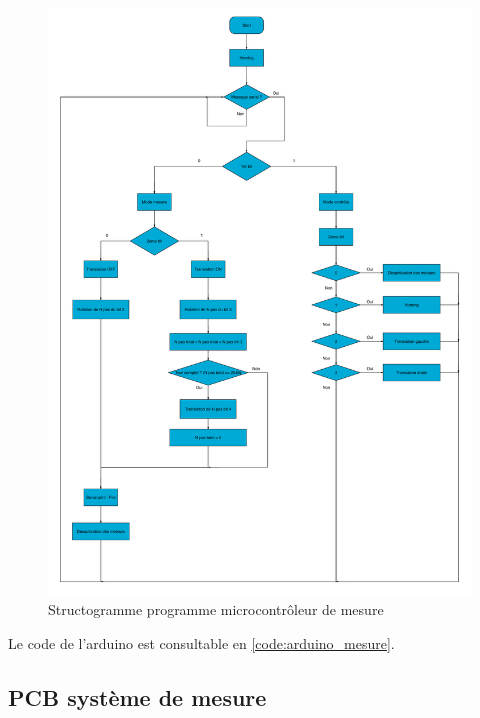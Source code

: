 \begin{figure}[H]
    \centering
    \includegraphics[width = \textwidth]{assets/figures/ameliorations/Structogramme_arduino.pdf}
    \caption[Structogramme programme microcontrôleur de mesure]{Structogramme programme microcontrôleur de mesure}
\end{figure}
Le code de l'arduino est consultable en \autoref{code:arduino_mesure}.

\newpage
\subsection{PCB système de mesure}

